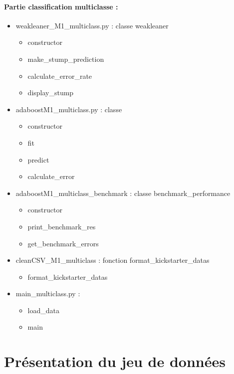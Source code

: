 \documentclass{article}
\begin{document}
\paragraph{Partie classification multiclasse : }


\begin{itemize}
  \item weakleaner\_M1\_multiclass.py : classe weakleaner
  \begin{itemize}
    \item constructor
    \item make\_stump\_prediction
    \item calculate\_error\_rate
    \item display\_stump
  \end{itemize}
  \item adaboostM1\_multiclass.py : classe 
  \begin{itemize}
    \item constructor
    \item fit
    \item predict
    \item calculate\_error
  \end{itemize}
  \item adaboostM1\_multiclass\_benchmark : classe benchmark\_performance
  \begin{itemize}
        \item constructor
        \item print\_benchmark\_res
        \item get\_benchmark\_errors
    \end{itemize}
  \item cleanCSV\_M1\_multiclass : fonction format\_kickstarter\_datas
  \begin{itemize}
        \item format\_kickstarter\_datas
    \end{itemize}
  \item main\_multiclass.py :
  \begin{itemize}
          \item load\_data
          \item main
    \end{itemize}
\end{itemize}


\section{Présentation du jeu de données}
\end{document}
